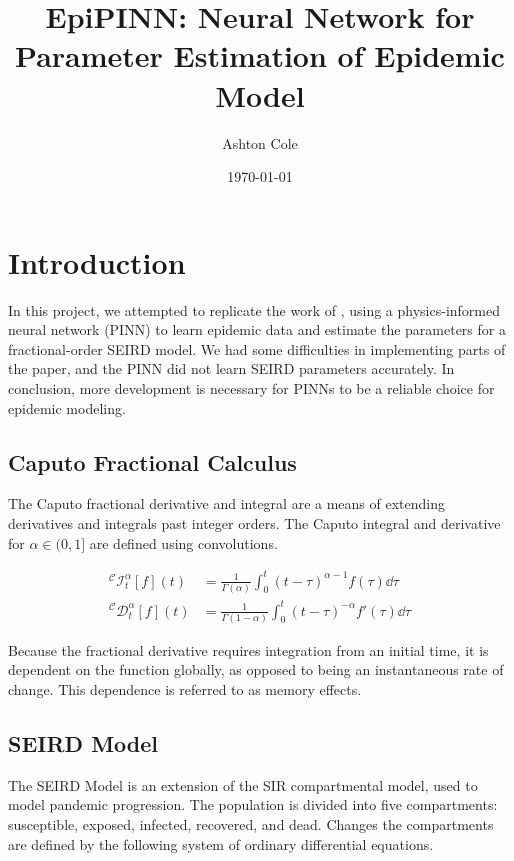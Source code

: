\documentclass{article}
\title{EpiPINN: Neural Network for Parameter Estimation of Epidemic Model}
\author{Ashton Cole}
\date{\today}
\begin{document}
	\maketitle
	
	\section{Introduction}
	\label{section:Introduction}
	
	In this project, we attempted to replicate the work of \cite{zinihi_identifying_2025}, using a physics-informed neural network (PINN) to learn epidemic data and estimate the parameters for a fractional-order SEIRD model. We had some difficulties in implementing parts of the paper, and the PINN did not learn SEIRD parameters accurately. In conclusion, more development is necessary for PINNs to be a reliable choice for epidemic modeling.
	
	\subsection{Caputo Fractional Calculus}
	\label{subsection:Caputo_Fractional_Calculus}
	
	The Caputo fractional derivative and integral are a means of extending derivatives and integrals past integer orders. The Caputo integral and derivative for $\alpha \in (0, 1]$  are defined using convolutions.
	
	\begin{align}
		^{\mathcal{C}}\mathcal{I}_{t}^{\alpha} [f] (t) &= \frac{1}{\Gamma(\alpha)} \int_{0}^{t} (t - \tau)^{\alpha - 1} f(\tau) \dd{\tau} \\
		^{\mathcal{C}}\mathcal{D}_{t}^{\alpha} [f] (t) &= \frac{1}{\Gamma(1- \alpha)} \int_{0}^{t} (t - \tau)^{-\alpha} f'(\tau) \dd{\tau}
	\end{align}
	
	Because the fractional derivative requires integration from an initial time, it is dependent on the function globally, as opposed to being an instantaneous rate of change. This dependence is referred to as memory effects.
		
	\subsection{SEIRD Model}
	\label{subsection:SEIRD_Model}
	
	The SEIRD Model is an extension of the SIR compartmental model, used to model pandemic progression. The population is divided into five compartments: susceptible, exposed, infected, recovered, and dead. Changes the compartments are defined by the following system of ordinary differential equations.
	
\end{document}
